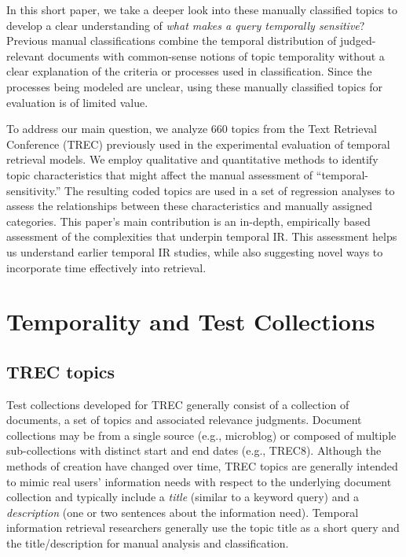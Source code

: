 \documentclass{sig-alternate}
\begin{document}
In this short paper, we take a deeper look into these manually classified topics to develop a clear understanding of \emph{what makes a query temporally sensitive}?  Previous manual classifications combine the temporal distribution of judged-relevant documents with common-sense notions of topic temporality without a clear explanation of the criteria or processes used in classification. Since the processes being modeled are unclear, using these manually classified topics for evaluation is of limited value. 

To address our main question, we analyze  660 topics from the Text Retrieval Conference (TREC) previously used in the experimental evaluation of temporal retrieval models. We employ qualitative and quantitative methods to identify topic characteristics that might affect the manual assessment of ``temporal-sensitivity.'' The resulting coded topics are used in a set of regression analyses to assess the relationships between these characteristics and manually assigned categories.   This paper's main contribution is an in-depth, empirically based assessment of the complexities that underpin temporal IR.  This assessment helps us understand earlier temporal IR studies, while also suggesting novel ways to incorporate time effectively into retrieval.

\section{Temporality and Test Collections}

\subsection{TREC topics}

Test collections developed for TREC generally consist of a collection of documents, a set of topics and associated relevance judgments. Document collections may be from a single source (e.g., microblog) or composed of multiple sub-collections with distinct start and end dates (e.g., TREC8).  Although the methods of creation have changed over time, TREC topics are generally intended to mimic real users' information needs with respect to the underlying document collection and typically include a \textit{title} (similar to a keyword query) and a \textit{description} (one or two sentences about the information need).  Temporal information retrieval researchers generally use the topic title as a short query and the title/description for manual analysis and classification.
\end{document}
